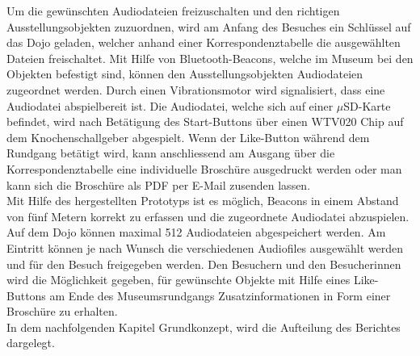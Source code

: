 Um die gewünschten Audiodateien freizuschalten und den richtigen Ausstellungsobjekten zuzuordnen, wird am Anfang des Besuches ein Schlüssel auf das Dojo geladen, welcher anhand einer Korrespondenztabelle die ausgewählten Dateien freischaltet. Mit Hilfe von Bluetooth-Beacons, welche im Museum bei den Objekten befestigt sind, können den Ausstellungsobjekten Audiodateien zugeordnet werden. Durch einen Vibrationsmotor wird signalisiert, dass eine Audiodatei abspielbereit ist. Die Audiodatei, welche sich auf einer $\mu$SD-Karte befindet, wird nach Betätigung des Start-Buttons über einen WTV020 Chip auf dem Knochenschallgeber abgespielt. Wenn der Like-Button während dem Rundgang betätigt wird, kann anschliessend am Ausgang über die Korrespondenztabelle eine individuelle Broschüre ausgedruckt werden oder man kann sich die Broschüre als PDF per E-Mail zusenden lassen.\\

Mit Hilfe des hergestellten Prototyps ist es möglich, Beacons in einem Abstand von fünf Metern korrekt zu erfassen und die zugeordnete Audiodatei abzuspielen. Auf dem Dojo können maximal 512 Audiodateien abgespeichert werden. Am Eintritt können je nach Wunsch die verschiedenen Audiofiles ausgewählt werden und für den Besuch freigegeben werden. Den Besuchern und den Besucherinnen wird die Möglichkeit gegeben, für gewünschte Objekte mit Hilfe eines Like-Buttons am Ende des Museumsrundgangs Zusatzinformationen in Form einer Broschüre zu erhalten.\\
 
In dem nachfolgenden Kapitel Grundkonzept, wird die Aufteilung des Berichtes dargelegt. 
